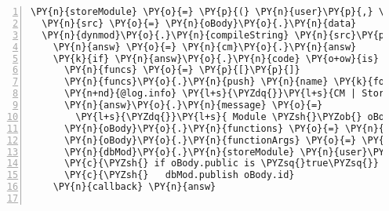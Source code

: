 \begin{Verbatim}[fontsize=\scriptsize,commandchars=\\\{\},numbers=left,firstnumber=1,stepnumber=1]
\PY{n}{storeModule} \PY{o}{=} \PY{p}{(} \PY{n}{user}\PY{p}{,} \PY{n}{oBody}\PY{p}{,} \PY{n}{modType}\PY{p}{,} \PY{n}{dbMod}\PY{p}{,} \PY{n}{callback} \PY{p}{)} \PY{o}{=}\PY{o}{\PYZgt{}}
  \PY{n}{src} \PY{o}{=} \PY{n}{oBody}\PY{o}{.}\PY{n}{data}
  \PY{n}{dynmod}\PY{o}{.}\PY{n}{compileString} \PY{n}{src}\PY{p}{,} \PY{n}{user}\PY{o}{.}\PY{n}{username}\PY{p}{,} \PY{n+nb}{id}\PY{p}{:} \PY{l+s}{\PYZsq{}}\PY{l+s}{dummyRule}\PY{l+s}{\PYZsq{}} \PY{p}{,} \PY{n}{oBody}\PY{o}{.}\PY{n}{id}\PY{p}{,} \PY{n}{oBody}\PY{o}{.}\PY{n}{lang}\PY{p}{,} \PY{n}{modType}\PY{p}{,} \PY{n}{null}\PY{p}{,} \PY{p}{(} \PY{n}{cm} \PY{p}{)} \PY{o}{=}\PY{o}{\PYZgt{}}
    \PY{n}{answ} \PY{o}{=} \PY{n}{cm}\PY{o}{.}\PY{n}{answ}
    \PY{k}{if} \PY{n}{answ}\PY{o}{.}\PY{n}{code} \PY{o+ow}{is} \PY{l+m+mi}{200}
      \PY{n}{funcs} \PY{o}{=} \PY{p}{[}\PY{p}{]}
      \PY{n}{funcs}\PY{o}{.}\PY{n}{push} \PY{n}{name} \PY{k}{for} \PY{n}{name}\PY{p}{,} \PY{n+nb}{id} \PY{n}{of} \PY{n}{cm}\PY{o}{.}\PY{n}{module}
      \PY{n+nd}{@log.info} \PY{l+s}{\PYZdq{}}\PY{l+s}{CM | Storing new module with functions \PYZsh{}\PYZob{} funcs.join( }\PY{l+s}{\PYZsq{}}\PY{l+s}{, }\PY{l+s}{\PYZsq{}}\PY{l+s}{ ) \PYZcb{}}\PY{l+s}{\PYZdq{}}
      \PY{n}{answ}\PY{o}{.}\PY{n}{message} \PY{o}{=} 
        \PY{l+s}{\PYZdq{}}\PY{l+s}{ Module \PYZsh{}\PYZob{} oBody.id \PYZcb{} successfully stored! Found following function(s): \PYZsh{}\PYZob{} funcs \PYZcb{}}\PY{l+s}{\PYZdq{}}
      \PY{n}{oBody}\PY{o}{.}\PY{n}{functions} \PY{o}{=} \PY{n}{JSON}\PY{o}{.}\PY{n}{stringify} \PY{n}{funcs}
      \PY{n}{oBody}\PY{o}{.}\PY{n}{functionArgs} \PY{o}{=} \PY{n}{JSON}\PY{o}{.}\PY{n}{stringify} \PY{n}{cm}\PY{o}{.}\PY{n}{funcParams}
      \PY{n}{dbMod}\PY{o}{.}\PY{n}{storeModule} \PY{n}{user}\PY{o}{.}\PY{n}{username}\PY{p}{,} \PY{n}{oBody}
      \PY{c}{\PYZsh{} if oBody.public is \PYZsq{}true\PYZsq{}}
      \PY{c}{\PYZsh{}   dbMod.publish oBody.id}
    \PY{n}{callback} \PY{n}{answ}


\end{Verbatim}

